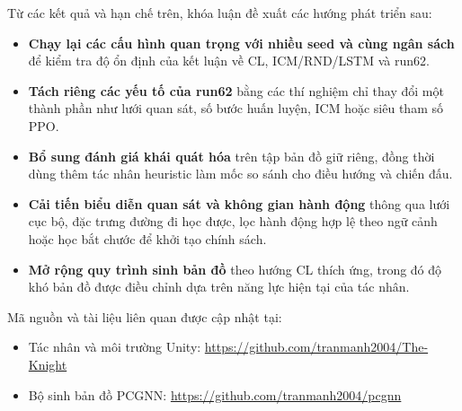 \vspace{0.5cm}

Từ các kết quả và hạn chế trên, khóa luận đề xuất các hướng phát triển sau:

\renewcommand{\labelitemi}{$-$}
\begin{itemize}
    \item \textbf{Chạy lại các cấu hình quan trọng với nhiều seed và cùng ngân sách} để kiểm tra độ ổn định của kết luận về CL, ICM/RND/LSTM và run62.

    \item \textbf{Tách riêng các yếu tố của run62} bằng các thí nghiệm chỉ thay đổi một thành phần như lưới quan sát, số bước huấn luyện, ICM hoặc siêu tham số PPO.

    \item \textbf{Bổ sung đánh giá khái quát hóa} trên tập bản đồ giữ riêng, đồng thời dùng thêm tác nhân heuristic làm mốc so sánh cho điều hướng và chiến đấu.

    \item \textbf{Cải tiến biểu diễn quan sát và không gian hành động} thông qua lưới cục bộ, đặc trưng đường đi học được, lọc hành động hợp lệ theo ngữ cảnh hoặc học bắt chước để khởi tạo chính sách.

    \item \textbf{Mở rộng quy trình sinh bản đồ} theo hướng CL thích ứng, trong đó độ khó bản đồ được điều chỉnh dựa trên năng lực hiện tại của tác nhân.
\end{itemize}

\vspace{0.5cm}

Mã nguồn và tài liệu liên quan được cập nhật tại:
\renewcommand{\labelitemi}{$-$}
\begin{itemize}
    \item Tác nhân và môi trường Unity: \url{https://github.com/tranmanh2004/The-Knight}
    \item Bộ sinh bản đồ PCGNN: \url{https://github.com/tranmanh2004/pcgnn}
\end{itemize}
